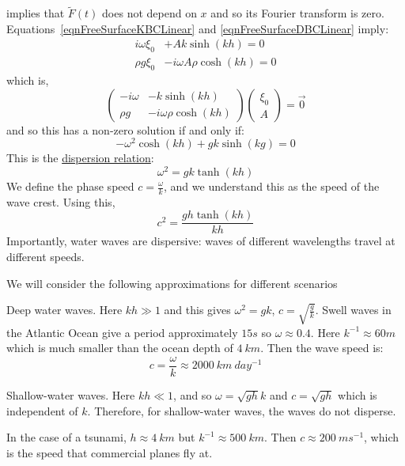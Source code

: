 \documentclass[../Main.tex]{subfiles}
\begin{document}
 implies that $\tilde{F}(t)$ does not depend on $x$ and so its Fourier transform is zero. Equations~\ref{eqnFreeSurfaceKBCLinear} and \ref{eqnFreeSurfaceDBCLinear} imply:
\begin{align*}
    i\omega \xi_0 &+ A k \sinh(kh) = 0 \\
    \rho g \xi_0 &- i\omega A \rho \cosh(kh) = 0
\end{align*}
which is,
\begin{equation*}
    \begin{pmatrix}
        -i\omega & -k\sinh(kh) \\
        \rho g & -i\omega \rho \cosh(kh)
    \end{pmatrix}
    \begin{pmatrix}\xi_0 \\ A\end{pmatrix} = \vec0
\end{equation*}
and so this has a non-zero solution if and only if:
\begin{equation*}
    -\omega^2 \cosh(kh) + gk\sinh(kg) = 0
\end{equation*}
This is the \underline{dispersion relation}:
\begin{equation}
    \omega^2 = gk\tanh(kh)
    \label{eqnDispersionRelation}
\end{equation}
We define the phase speed $c = \frac{\omega}{k}$, and we understand this as the speed of the wave crest. Using this,
\begin{equation*}
    c^2 = \frac{gh \tanh(kh)}{kh}
\end{equation*}
Importantly, water waves are dispersive: waves of different wavelengths travel at different speeds.
\begin{examples}{
        We will consider the following approximations for different scenarios
    }
    \item Deep water waves.
        Here $kh \gg 1$ and this gives $\omega^2 = gk$, $c = \sqrt{\frac{g}{k}}$. Swell waves in the Atlantic Ocean give a period approximately $15s$ so $\omega \approx 0.4$. Here $k^{-1} \approx 60m$ which is much smaller than the ocean depth of $4~km$. Then the wave speed is:
        \begin{equation*}
            c = \frac{\omega}{k} \approx 2000~km~day^{-1}
        \end{equation*}
    \item Shallow-water waves.
        Here $kh \ll 1$, and so $\omega = \sqrt{gh}k$ and $c = \sqrt{gh}$ which is independent of $k$. Therefore, for shallow-water waves, the waves do not disperse.

        In the case of a tsunami, $h \approx 4~km$ but $k^{-1} \approx 500~km$. Then $c \approx 200~ms^{-1}$, which is the speed that commercial planes fly at.
\end{examples}
\end{document}

